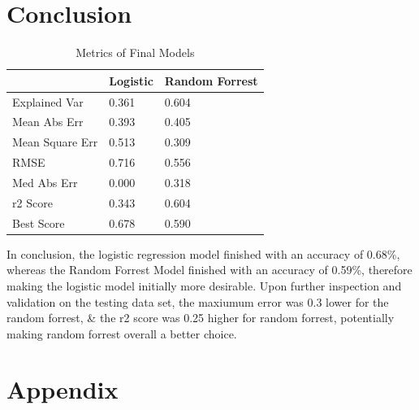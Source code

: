 \documentclass[11pt, a4paper, twocolumn]{article}
\begin{document}
\section{Conclusion}

\begin{table}[H]
	\centering
	\begin{tabular}{l|l|l|}
	\cline{2-3}
												   & Logistic & Random Forrest \\ \hline
	\multicolumn{1}{|l|}{Explained Var} 		   & 0.361                     & 0.604                           \\ \hline
	\multicolumn{1}{|l|}{Mean Abs Err}       	   & 0.393                     & 0.405                           \\ \hline
	\multicolumn{1}{|l|}{Mean Square Err}          & 0.513                     & 0.309                           \\ \hline
	\multicolumn{1}{|l|}{RMSE}   				   & 0.716                     & 0.556                           \\ \hline
	\multicolumn{1}{|l|}{Med Abs Err}    		   & 0.000                     & 0.318                           \\ \hline
	\multicolumn{1}{|l|}{r2 Score}                 & 0.343                     & 0.604                           \\ \hline
	\multicolumn{1}{|l|}{Best Score}               & 0.678                     & 0.590                           \\ \hline
	\end{tabular}
	\caption{Metrics of Final Models}
	\label{table:metrics}
\end{table}

In conclusion, the logistic regression model finished with an accuracy of 0.68\%, whereas the Random Forrest Model finished with an accuracy of 0.59\%, therefore making the logistic model initially more desirable.
Upon further inspection and validation on the testing data set, the maxiumum error was 0.3 lower for the random forrest, \& the r2 score was 0.25 higher for random forrest, potentially making random forrest overall a better choice.

\section*{Appendix}
\centering



	
\end{document}
